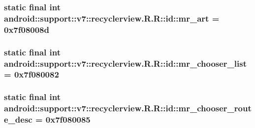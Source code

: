 \hypertarget{classandroid_1_1support_1_1v7_1_1recyclerview_1_1_r_1_1id_e20d9719db1efc3d56cd0e6103187d62}{
\subsubsection[{mr\_\-art}]{\setlength{\rightskip}{0pt plus 5cm}static final int android::support::v7::recyclerview.R.R::id::mr\_\-art = 0x7f08008d}}
\label{classandroid_1_1support_1_1v7_1_1recyclerview_1_1_r_1_1id_e20d9719db1efc3d56cd0e6103187d62}


\hypertarget{classandroid_1_1support_1_1v7_1_1recyclerview_1_1_r_1_1id_ab5fae688d97e0e5592ddb820d6cbfd8}{
\subsubsection[{mr\_\-chooser\_\-list}]{\setlength{\rightskip}{0pt plus 5cm}static final int android::support::v7::recyclerview.R.R::id::mr\_\-chooser\_\-list = 0x7f080082}}
\label{classandroid_1_1support_1_1v7_1_1recyclerview_1_1_r_1_1id_ab5fae688d97e0e5592ddb820d6cbfd8}


\hypertarget{classandroid_1_1support_1_1v7_1_1recyclerview_1_1_r_1_1id_94dfa8532f26662e3432cbab1643e088}{
\subsubsection[{mr\_\-chooser\_\-route\_\-desc}]{\setlength{\rightskip}{0pt plus 5cm}static final int android::support::v7::recyclerview.R.R::id::mr\_\-chooser\_\-route\_\-desc = 0x7f080085}}
\label{classandroid_1_1support_1_1v7_1_1recyclerview_1_1_r_1_1id_94dfa8532f26662e3432cbab1643e088}


